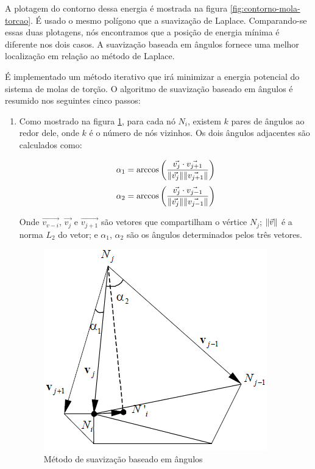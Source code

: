 A plotagem do contorno dessa energia é mostrada na figura \ref{fig:contorno-mola-torcao}. É usado o mesmo polígono que a suavização de Laplace. Comparando-se essas duas plotagens, nós encontramos que a posição de energia mínima é diferente nos dois casos. A suavização baseada em ângulos fornece uma melhor localização em relação ao método de Laplace.

É implementado um método iterativo que irá minimizar a energia potencial do sistema de molas de torção. O algoritmo de suavização baseado em ângulos é resumido nos seguintes cinco passos:

\begin{enumerate}
    \item Como mostrado na figura \ref{fig:angle-based}, para cada nó $N_i$, existem $k$ pares de ângulos ao redor dele, onde $k$ é o número de nós vizinhos. Os dois ângulos adjacentes são calculados como:
    
    \begin{equation*}
        \alpha_1 = \arccos{\qty(\frac{\vec{v_j} \cdot \vec{v_{j+1}}}{\norm{\vec{v_j}} \norm{\vec{v_{j+1}}} })}
    \end{equation*}
    \begin{equation*}
        \alpha_2 = \arccos{\qty(\frac{\vec{v_j} \cdot \vec{v_{j-1}}}{\norm{\vec{v_j}} \norm{\vec{v_{j-1}}} })}
    \end{equation*}

    Onde $\vec{v_{v-i}}$, $\vec{v_j}$ e $\vec{v_{j+1}}$ são vetores que compartilham o vértice $N_j$; $\norm{\vec{v}}$ é a norma $L_2$ do vetor; e $\alpha_1$, $\alpha_2$ são os ângulos determinados pelos três vetores.

    \begin{figure}[]
        \centering
        \includegraphics{fig/angle-based.png}
        \caption{Método de suavização baseado em ângulos}
        \label{fig:angle-based}
    \end{figure}


\end{enumerate}
